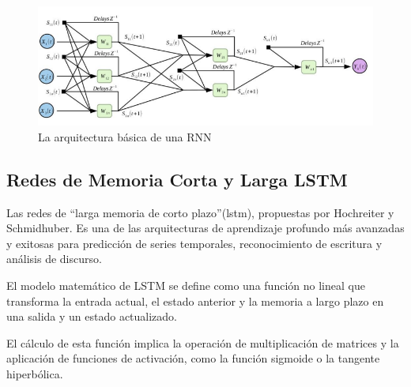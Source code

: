 \begin{figure}[H]
  \begin{center}
    \includegraphics[scale=0.70]{./redes_recurrentes.png}
    \caption{La arquitectura básica de una RNN}
    \label{fig:red_recurreente}
  \end{center}
\end{figure}


\subsection{Redes de Memoria Corta y Larga  LSTM}

Las redes de “larga memoria de corto plazo”(\gls{lstm}), propuestas por
Hochreiter y Schmidhuber. Es una de las arquitecturas de aprendizaje profundo más avanzadas y exitosas para predicción de series temporales, reconocimiento de escritura y análisis de discurso\cite{fernandez2021estimacion}.

\vspace{1\baselineskip}
El modelo matemático de LSTM se define como una función no lineal que
transforma la entrada actual, el estado anterior y la memoria a largo plazo en una salida y un estado actualizado.

\vspace{1\baselineskip}
El cálculo de esta función implica la operación de multiplicación de matrices y
la aplicación de funciones de activación, como la función sigmoide o la
tangente hiperbólica\cite{tomas2023prediccion}.



